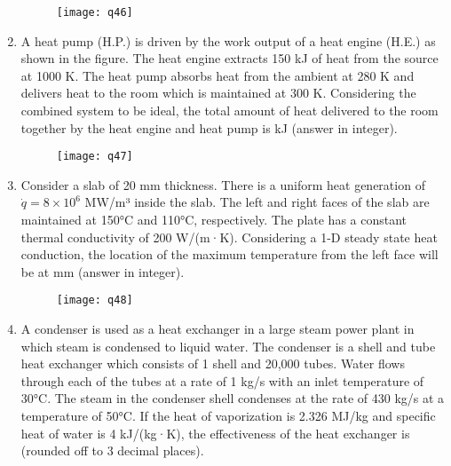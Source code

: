 \documentclass[journal,11pt,onecolumn]{IEEEtran}
\begin{document}
\begin{enumerate}[resume]
          \begin{figure}[H]
              \centering
              \texttt{[image: q46]}
              \caption{}
              \label{fig:q46}
          \end{figure}

    \item A heat pump (H.P.) is driven by the work output of a heat engine (H.E.) as shown in the figure. The heat engine extracts 150 kJ of heat from the source at 1000 K. The heat pump absorbs heat from the ambient at 280 K and delivers heat to the room which is maintained at 300 K. Considering the combined system to be ideal, the total amount of heat delivered to the room together by the heat engine and heat pump is \underline{\hspace{2cm}} kJ (answer in integer).

          \begin{figure}[H]
              \centering
              \texttt{[image: q47]}
              \caption{}
              \label{fig:q47}
          \end{figure}

    \item Consider a slab of 20 mm thickness. There is a uniform heat generation of $\dot{q} = 8 \times 10^6$ MW/m³ inside the slab. The left and right faces of the slab are maintained at 150°C and 110°C, respectively. The plate has a constant thermal conductivity of 200 W/(m·K). Considering a 1-D steady state heat conduction, the location of the maximum temperature from the left face will be at \underline{\hspace{2cm}} mm (answer in integer).
          \begin{figure}[H]
              \centering
              \texttt{[image: q48]}
              \caption{}
              \label{fig:q48}
          \end{figure}

    \item A condenser is used as a heat exchanger in a large steam power plant in which steam is condensed to liquid water. The condenser is a shell and tube heat exchanger which consists of 1 shell and 20,000 tubes. Water flows through each of the tubes at a rate of 1 kg/s with an inlet temperature of 30°C. The steam in the condenser shell condenses at the rate of 430 kg/s at a temperature of 50°C. If the heat of vaporization is 2.326 MJ/kg and specific heat of water is 4 kJ/(kg·K), the effectiveness of the heat exchanger is \underline{\hspace{2cm}} (rounded off to 3 decimal places).


\end{enumerate}
\end{document}
